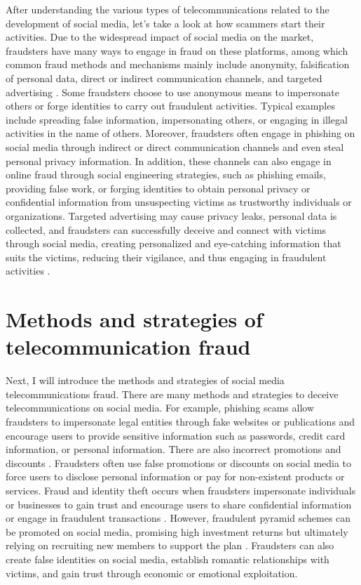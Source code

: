 \documentclass[man,floatsintext]{apa7}
\begin{document}
After understanding the various types of telecommunications related to the development of social media, let's take a look at how scammers start their activities. Due to the widespread impact of social media on the market, fraudsters have many ways to engage in fraud on these platforms, among which common fraud methods and mechanisms mainly include anonymity, falsification of personal data, direct or indirect communication channels, and targeted advertising \autocite{hajiahmadImpactDigitalizationOccupational2020}. Some fraudsters choose to use anonymous means to impersonate others or forge identities to carry out fraudulent activities. Typical examples include spreading false information, impersonating others, or engaging in illegal activities in the name of others. Moreover, fraudsters often engage in phishing on social media through indirect or direct communication channels and even steal personal privacy information. In addition, these channels can also engage in online fraud through social engineering strategies, such as phishing emails, providing false work, or forging identities to obtain personal privacy or confidential information from unsuspecting victims as trustworthy individuals or organizations. Targeted advertising may cause privacy leaks, personal data is collected, and fraudsters can successfully deceive and connect with victims through social media, creating personalized and eye-catching information that suits the victims, reducing their vigilance, and thus engaging in fraudulent activities \autocite{baesensFraudAnalyticsUsing2015}.

\section{Methods and strategies of telecommunication fraud}

Next, I will introduce the methods and strategies of social media telecommunications fraud. There are many methods and strategies to deceive telecommunications on social media. For example, phishing scams allow fraudsters to impersonate legal entities through fake websites or publications and encourage users to provide sensitive information such as passwords, credit card information, or personal information. There are also incorrect promotions and discounts \autocite{choiVoicePhishingFraud2017}.
Fraudsters often use false promotions or discounts on social media to force users to disclose personal information or pay for non-existent products or services. Fraud and identity theft occurs when fraudsters impersonate individuals or businesses to gain trust and encourage users to share confidential information or engage in fraudulent transactions \autocite{chenPhishingScamsDetection2020}. However, fraudulent pyramid schemes can be promoted on social media, promising high investment returns but ultimately relying on recruiting new members to support the plan \autocite{bosleyDecisionmakingVulnerabilityPyramid2019}. Fraudsters can also create false identities on social media, establish romantic relationships with victims, and gain trust through economic or emotional exploitation.
\end{document}
